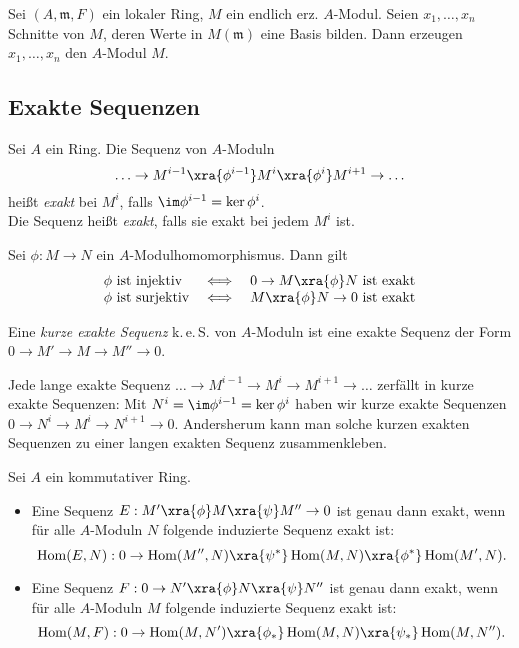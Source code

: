 \documentclass{cheat-sheet}
\DeclareMathOperator{\Hom}{Hom} %
\newcommand{\mmm}{\mathfrak{m}}
\newcommand{\keS}{k.\,e.\,S.} %
\begin{document}
\begin{prop}
  Sei $(A, \mmm, F)$ ein lokaler Ring, $M$ ein endlich erz. $A$-Modul.
  Seien $x_1, \ldots, x_n$ Schnitte von $M$, deren Werte in $M(\mmm)$ eine Basis bilden.
  Dann erzeugen $x_1, \ldots, x_n$ den $A$-Modul $M$.
\end{prop}

\subsection{Exakte Sequenzen}


\begin{defn}
  Sei $A$ ein Ring.
  Die Sequenz von $A$-Moduln
  \[
    \ldots \to M^{i-1} \xra{\phi^{i-1}} M^i \xra{\phi^i} M^{i+1} \to \ldots
  \]
  heißt \emph{exakt} bei $M^i$, falls $\im \phi^{i-1} = \ker \phi^i$. \\
  Die Sequenz heißt \emph{exakt}, falls sie exakt bei jedem $M^i$ ist.
\end{defn}

\begin{bsp}
  Sei $\phi : M \to N$ ein $A$-Modulhomomorphismus.
  Dann gilt
  \[
    \begin{array}{l c l}
      \text{$\phi$ ist injektiv} & \iff & 0 \to M \xra{\phi} N \text{ ist exakt} \\
      \text{$\phi$ ist surjektiv} & \iff & M \xra{\phi} N \to 0 \text{ ist exakt}
    \end{array}
  \]
\end{bsp}

\begin{defn}
  Eine \emph{kurze exakte Sequenz} \keS{} von $A$-Moduln ist eine exakte Sequenz der Form $0 \to M' \to M \to M'' \to 0$.
\end{defn}

\begin{bem}
  Jede lange exakte Sequenz $\ldots \to M^{i-1} \to M^i \to M^{i+1} \to \ldots$ zerfällt in kurze exakte Sequenzen: Mit $N^i = \im \phi^{i-1} = \ker \phi^i$ haben wir kurze exakte Sequenzen $0 \to N^i \to M^i \to N^{i+1} \to 0$.
  Andersherum kann man solche kurzen exakten Sequenzen zu einer langen exakten Sequenz zusammenkleben.
\end{bem}

\begin{lem}
  Sei $A$ ein kommutativer Ring.
  \begin{itemize}
    \item Eine Sequenz $E : M' \xra{\phi} M \xra{\psi} M'' \to 0$ ist genau dann exakt, wenn für alle $A$-Moduln $N$ folgende induzierte Sequenz exakt ist:
    \[
      \Hom(E, N) : 0 \to \Hom(M'', N) \xra{\psi^*} \Hom(M, N) \xra{\phi^*} \Hom(M', N).
    \]
    \item Eine Sequenz $F : 0 \to N' \xra{\phi} N \xra{\psi} N''$ ist genau dann exakt, wenn für alle $A$-Moduln $M$ folgende induzierte Sequenz exakt ist:
    \[
      \Hom(M, F) : 0 \to \Hom(M, N') \xra{\phi_*} \Hom(M, N) \xra{\psi_*} \Hom(M, N'').
    \]
  \end{itemize}
\end{lem}
\end{document}
